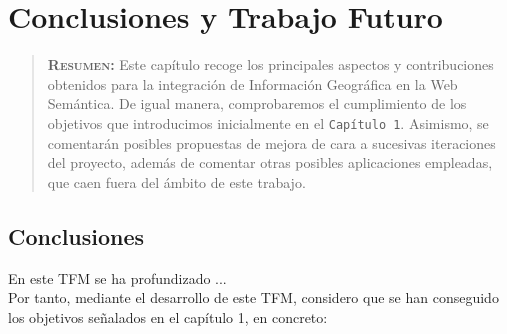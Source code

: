 

\chapter{Conclusiones y Trabajo Futuro}
\label{ch:Conclusiones y Trabajo Futuro}

\begin{quote}
  {\bf\textsc{Resumen:}} Este capítulo recoge los principales aspectos y contribuciones obtenidos para la integración de Información Geográfica en la Web Semántica. De igual manera, comprobaremos el cumplimiento de los objetivos que introducimos inicialmente en el \texttt{Capítulo 1}. Asimismo, se comentarán posibles propuestas de mejora de cara a sucesivas iteraciones del proyecto, además de comentar otras posibles aplicaciones empleadas, que caen fuera del ámbito de este trabajo.
\end{quote}


\section{Conclusiones}

En este TFM se ha profundizado ... \\


Por tanto, mediante el desarrollo de este TFM, considero que se han conseguido los objetivos señalados en el capítulo 1, en concreto:

